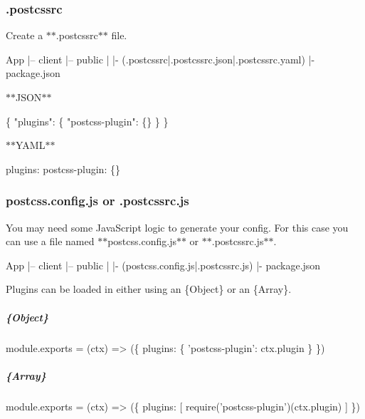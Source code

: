 \subsubsection*{{\ttfamily .postcssrc}}

Create a $\ast$$\ast${\ttfamily .postcssrc}$\ast$$\ast$ file.


\begin{DoxyCode}
App
  |– client
  |– public
  |
  |- (.postcssrc|.postcssrc.json|.postcssrc.yaml)
  |- package.json
\end{DoxyCode}


$\ast$$\ast${\ttfamily J\+S\+ON}$\ast$$\ast$ 
\begin{DoxyCode}
\{
  "plugins": \{
    "postcss-plugin": \{\}
  \}
\}
\end{DoxyCode}


$\ast$$\ast${\ttfamily Y\+A\+ML}$\ast$$\ast$ 
\begin{DoxyCode}
plugins:
  postcss-plugin: \{\}
\end{DoxyCode}


\subsubsection*{{\ttfamily postcss.\+config.\+js} or {\ttfamily .postcssrc.\+js}}

You may need some Java\+Script logic to generate your config. For this case you can use a file named $\ast$$\ast${\ttfamily postcss.\+config.\+js}$\ast$$\ast$ or $\ast$$\ast${\ttfamily .postcssrc.\+js}$\ast$$\ast$.


\begin{DoxyCode}
App
  |– client
  |– public
  |
  |- (postcss.config.js|.postcssrc.js)
  |- package.json
\end{DoxyCode}


Plugins can be loaded in either using an {\ttfamily \{Object\}} or an {\ttfamily \{Array\}}.

\subparagraph*{{\ttfamily \{Object\}}}


\begin{DoxyCode}
module.exports = (ctx) => (\{
  plugins: \{
    'postcss-plugin': ctx.plugin
  \}
\})
\end{DoxyCode}


\subparagraph*{{\ttfamily \{Array\}}}


\begin{DoxyCode}
module.exports = (ctx) => (\{
  plugins: [
    require('postcss-plugin')(ctx.plugin)
  ]
\})
\end{DoxyCode}


